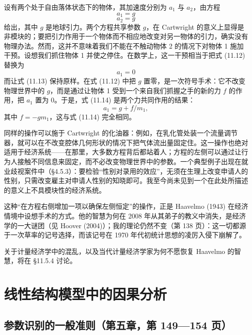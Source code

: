 设有两个处于自由落体状态下的物体，其加速度分别为 $a_1$ 与 $a_2$，由方程
\begin{equation}
a_1=g \tag{11.12}
\end{equation}
\begin{equation}
a_2=g \tag{11.13}
\end{equation}
给出，其中 $g$ 是地球引力。两个方程共享参数 $g$，在 Cartwright 的意义上显得是非模块的；要把引力作用于一个物体而不相应地改变对另一物体的引力，确实没有物理办法。然而，这并不意味着我们不能在不触动物体 2 的情况下对物体 1 施加干预。设想我们抓住物体 1 并使之停住。在数学上，这一干预相当于把式 \textup{(11.12)} 替换为
\begin{equation}
a_1=0 \tag{11.14}
\end{equation}
而让式 \textup{(11.13)} 保持原样。在式 \textup{(11.12)} 中把 $g$ 置零，是一次符号手术：它不改变物理世界中的 $g$，而是通过让物体 1 受到一个来自我们抓握之手的新的力 $f$ 的作用，把 $a_1$ 置为 $0$。于是，式 \textup{(11.14)} 是两个力共同作用的结果：
\begin{equation}
a_1=g+f/m_1, \tag{11.15}
\end{equation}
其中 $f=-gm_1$，这与式 \textup{(11.14)} 完全相同。

同样的操作可以施于 Cartwright 的化油器：例如，在乳化管处装一个流量调节器，就可以在不改变腔体几何形状的情况下把气体流出量固定住。这一操作也绝对适用于经济系统——在那里，大多数方程背后都站着人；方程的左侧可以通过让行为人接触不同信息来固定，而不必改变物理世界中的参数。一个典型例子出现在就业歧视案件中（\S4.5.3）：要检验“性别对录用的效应”，无须在生理上改变申请人的性别，只需改变雇主对申请人性别的知晓即可。我至今尚未见到一个在此处所描述的意义上不具模块性的经济系统。

这种“在方程右侧增加一项以确保左侧恒定”的操作，正是 Haavelmo (1943) 在经济情境中设想手术的方式。他的智慧为何在 2008 年从其弟子的教义中消失，是经济学的一大谜团（见 Hoover (2004)）；我的理论仍然不变（第 138 页）：这一切都源于一次草率的记号选择，而该记号在 1970 年代初统计思想的凌厉入侵下崩解了。

关于计量经济学中的混乱，以及当代计量经济学家为何不愿恢复 Haavelmo 的智慧，将在 \S11.5.4 讨论。

\section{线性结构模型中的因果分析}

\subsection{参数识别的一般准则（第五章，第 149—154 页）}

